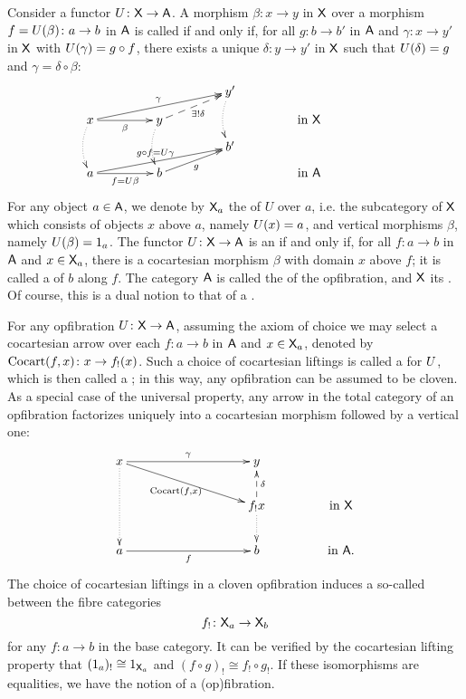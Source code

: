 \documentclass{amsart}
\begin{document}
Consider a functor $U \colon\mathsf{X} \to \mathsf{A}$. A morphism $\beta \colon x \to y$ in $\mathsf{X} $ over a morphism $f = U(\beta) \colon a \to b$ in $\mathsf{A}$ is called  if and only if, for all $g \colon b \to b'$ in $\mathsf{A}$ and $\gamma \colon x\to y'$ in $\mathsf{X} $ with $U(\gamma) = g\circ f$, there exists a unique $\delta \colon y\to y'$ in $\mathsf{X}$ such that $U(\delta) = g$ and $\gamma = \delta \circ \beta$:
\begin{equation}\label{eq:opfibration}
\xymatrix @R=.1in @C=.6in
{&& y'\ar @{.>}@/_/[dd] &&\\
x\ar[r]_-{\beta} \ar @{.>}@/_/[dd]
\ar[urr]^-{\gamma} & 
y \ar @{.>}@/_/[dd] \ar @{-->}[ur]_-{\exists! \delta}
&& \textrm{in }\X\\
&& b' &&\\
a\ar[r]_-{f=\U\beta} \ar[urr]^-{g\circ f=\U\gamma}
 & b \ar[ur]_-g && \textrm{in }\A}
\end{equation}
For any object $a\in\mathsf{A}$, we denote by $\mathsf{X}_a$ the  of $U$ over $a$, i.e. the subcategory of $\mathsf{X}$ which consists of objects $x$ above $a$, namely $U(x) = a$, and vertical morphisms $\beta$, namely $U(\beta) = 1_a$. The functor $U \colon \mathsf{X} \to \mathsf{A}$ is an  if and only if, for all $f \colon a \to b$ in $\mathsf{A}$ and $x\in\mathsf{X}_a$, there is a cocartesian morphism $\beta$ with domain $x$ above $f$; it is called a  of $b$ along $f$. The category $\mathsf{A}$ is called the  of the opfibration, and $\mathsf{X} $ its .
Of course, this is a dual notion to that of a .

For any opfibration $U\colon \mathsf{X} \to\mathsf{A}$, assuming the axiom of choice we may select a cocartesian arrow over each $f\colon a\to b$ in $\mathsf{A}$ and $x\in\mathsf{X}_a$, denoted by $\mathrm{Cocart}(f,x)\colon x\to f_!(x)$. Such a choice of cocartesian liftings is called a  for $U$, which is then called a ; in this way, any opfibration can be assumed to be cloven. As a special case of the universal property, any arrow in the total category of an opfibration factorizes uniquely into a cocartesian morphism followed by a vertical one:
\begin{equation}\label{factor}
\xymatrix @C=.6in @R=.3in
{x \ar @{.>}[dd]\ar[rr]^\gamma \ar[drr]_-{\Cocart(f,x)} && y &\\
&& f_!x \ar @{-->}[u]_-{\delta} \ar @{.>}[d] & \textrm{in }\X  \\
a\ar[rr]_-{f} && b & \textrm{in }\A.}
\end{equation}
The choice of cocartesian liftings in a cloven opfibration induces a so-called  between the fibre categories
\begin{equation}\label{reindexing}
 f_!\colon\mathsf{X}_a\to\mathsf{X}_b
\end{equation}
for any $f\colon a\to b$ in the base category. It can be verified by the cocartesian lifting property that $(1_a)_!\cong1_{\mathsf{X}_a}$ and $(f\circ g)_!\cong f_!\circ g_!$. If these isomorphisms are equalities, we have the notion of a  (op)fibration.
\end{document}
